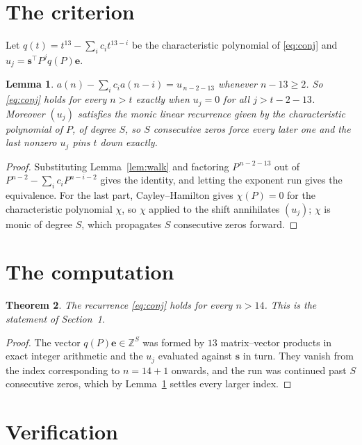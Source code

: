 \documentclass[11pt,a4paper]{article}
\theoremstyle{plain}
\newtheorem{theorem}{Theorem}
\newtheorem{lemma}[theorem]{Lemma}
\theoremstyle{definition}
\begin{document}
\section{The criterion}

Let $q(t)=t^{13}-\sum_i c_i t^{13-i}$ be the characteristic polynomial of
\eqref{eq:conj} and $u_j=\mathbf{s}^{\!\top}P^{j}q(P)\mathbf{e}$.

\begin{lemma}\label{lem:crit}
$a(n)-\sum_i c_i a(n-i)=u_{\,n-2-13}$ whenever $n-13\ge2$. So \eqref{eq:conj}
holds for every $n>t$ exactly when $u_j=0$ for all $j>t-2-13$. Moreover $(u_j)$
satisfies the monic linear recurrence given by the characteristic polynomial of $P$, of
degree $S$, so $S$ consecutive zeros force every later one and the last nonzero $u_j$ pins
$t$ down exactly.
\end{lemma}

\begin{proof}
Substituting Lemma~\ref{lem:walk} and factoring $P^{\,n-2-13}$ out of
$P^{n-2}-\sum_i c_i P^{n-i-2}$ gives the identity, and letting the exponent run gives the
equivalence. For the last part, Cayley--Hamilton gives $\chi(P)=0$ for the characteristic
polynomial $\chi$, so $\chi$ applied to the shift annihilates $(u_j)$; $\chi$ is monic of
degree $S$, which propagates $S$ consecutive zeros forward.
\end{proof}

\section{The computation}

\begin{theorem}
The recurrence \eqref{eq:conj} holds for every $n>14$. This is the statement of
Section~1.
\end{theorem}

\begin{proof}
The vector $q(P)\mathbf{e}\in\mathbb{Z}^{S}$ was formed by $13$ matrix--vector
products in exact integer arithmetic and the $u_j$ evaluated against $\mathbf{s}$ in turn.
They vanish from the index corresponding to $n=14+1$ onwards, and the run was continued
past $S$ consecutive zeros, which by Lemma~\ref{lem:crit} settles every larger index.
\end{proof}

\section{Verification}
\end{document}

